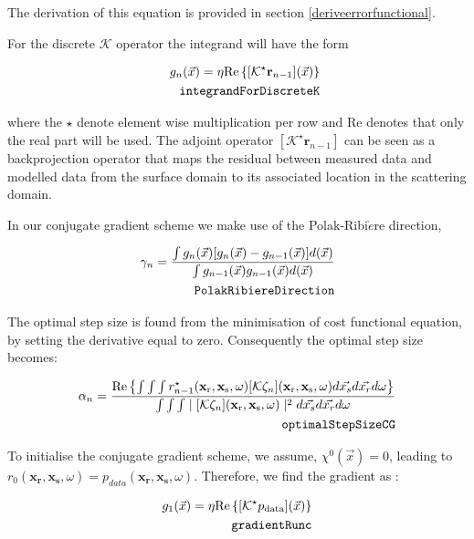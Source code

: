 \documentclass[10pt,a4paper]{article}
\newcommand{\real}[1]{\text{Re} \left\{ #1 \right\}}
\begin{document}
The derivation of this equation is provided in section
\ref{deriveerrorfunctional}.

For the discrete $\mathcal{K}$ operator the integrand will have the form

\begin{align} \label{eq:integrandForDiscreteK} g_n(\vec{x}) = \eta
\real{[\mathcal{K}^\star\mathbf{r}_{n-1}](\vec{x})}\\
\tag*{\texttt{integrandForDiscreteK}}
\end{align}

where the $\star$ denote element wise multiplication per row and Re
denotes that only the real part will be used.
The adjoint operator $[\mathcal{K}^\star\mathbf{r}_{n-1}]$ can be seen
as a backprojection operator that maps the residual between measured
data and modelled data from the surface domain to its associated
location in the scattering domain.

In our conjugate gradient scheme we make use of the
Polak-Ribi$\grave{e}$re direction,

\begin{align} \label{eq:PolakRibiereDirection} \gamma_n = \frac{\int
g_n(\vec{x})[g_n(\vec{x})-g_{n-1}(\vec{x})]d(\vec{x})}{\int
g_{n-1}(\vec{x}) g_{n-1}(\vec{x})d(\vec{x})}\\
\tag*{\texttt{PolakRibiereDirection}}
\end{align}

The optimal step size is found from the minimisation of cost
functional equation, by setting the derivative equal to zero.
Consequently the optimal step size becomes:

\begin{align} \label{eq:optimalStepSizeCG} \alpha_n = \frac {\real {\int \int
\int r^{\star}_{n-1}(\mathbf{x_\text{r}},\mathbf{x_\text{s}},\omega)[\mathcal{K}
\zeta_n](\mathbf{x_\text{r}},\mathbf{x_\text{s}},\omega)d\vec{x_s}d\vec{x_r}d\omega}}{\int
\int \int \mid[\mathcal{K}
\zeta_n](\mathbf{x_\text{r}},\mathbf{x_\text{s}},\omega) \mid^2
d\vec{x_s}d\vec{x_r}d\omega}\\
\tag*{\texttt{optimalStepSizeCG}}
\end{align}

To initialise the conjugate gradient scheme, we assume, $\chi^0
(\vec{x}) = 0$, leading to
$r_0(\mathbf{x_\text{r}},\mathbf{x_\text{s}},\omega) =
p_{data}(\mathbf{x_\text{r}},\mathbf{x_\text{s}},\omega)$.
Therefore, we find the gradient as :

\begin{align} \label{eq:gradientFunc} g_1(\vec{x}) = \eta
\real{[\mathcal{K}^\star p_\text{data}](\vec{x})}\\
\tag*{\texttt{gradientRunc}}
\end{align}
\end{document}
